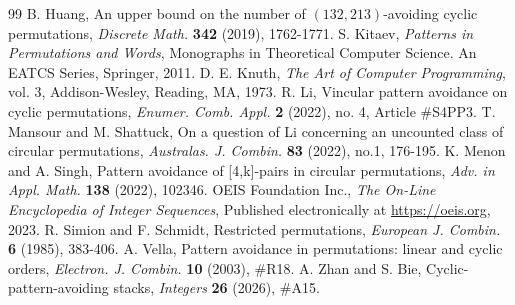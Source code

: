 \documentclass[10pt,a4paper]{amsart}
\numberwithin{equation}{section}
\begin{document}
\begin{thebibliography}{99}
 B. Huang, An upper bound on the number of $(132,213)$-avoiding cyclic permutations, \textit{Discrete Math.} \textbf{342} (2019), 1762-1771.
 S. Kitaev, \textit{Patterns in Permutations and Words}, Monographs in Theoretical Computer Science. An EATCS Series, Springer, 2011.
 D. E. Knuth, \textit{The Art of Computer Programming}, vol. 3, Addison-Wesley, Reading, MA, 1973.
 R. Li, Vincular pattern avoidance on cyclic permutations, \textit{Enumer. Comb. Appl.} \textbf{2} (2022), no. 4, Article \#S4PP3.
 T. Mansour and M. Shattuck, On a question of Li concerning an uncounted class of circular permutations, \textit{Australas. J. Combin.} \textbf{83} (2022), no.1, 176-195.
 K. Menon and A. Singh, Pattern avoidance of [4,k]-pairs in circular permutations, \textit{Adv. in Appl. Math.} \textbf{138} (2022), 102346.
 OEIS Foundation Inc., \textit{The On-Line Encyclopedia of Integer Sequences}, Published electronically at \url{https://oeis.org}, 2023.
 R. Simion and F. Schmidt, Restricted permutations, \textit{European J. Combin.} \textbf{6} (1985), 383-406.
 A. Vella, Pattern avoidance in permutations: linear and cyclic orders, \textit{Electron. J. Combin.} \textbf{10} (2003), \#R18.
 A. Zhan and S. Bie, Cyclic-pattern-avoiding stacks, \textit{Integers} \textbf{26} (2026), \#A15.
\end{thebibliography}
\end{document}
